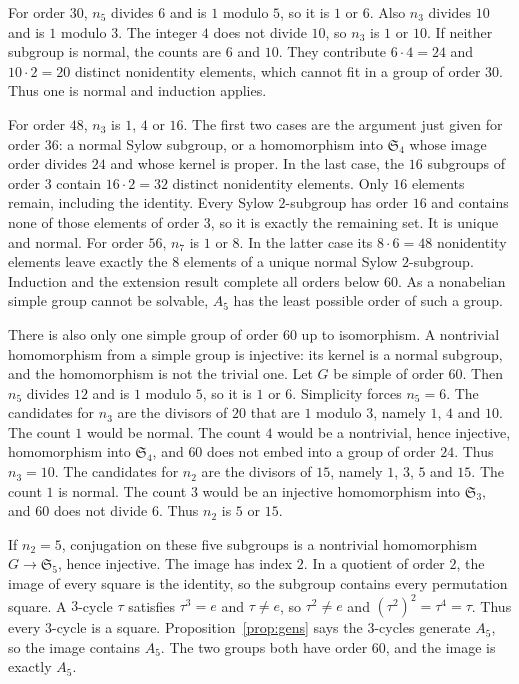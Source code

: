 For order $30$, $n_5$ divides $6$ and is $1$ modulo $5$, so it is $1$ or $6$.
Also $n_3$ divides $10$ and is $1$ modulo $3$. The integer $4$ does not divide $10$, so $n_3$ is $1$ or $10$.
If neither subgroup is normal, the counts are $6$ and $10$.
They contribute $6\cdot4=24$ and $10\cdot2=20$ distinct nonidentity elements, which cannot fit in a group of order $30$.
Thus one is normal and induction applies.

For order $48$, $n_3$ is $1$, $4$ or $16$. The first two cases are the argument just given for order $36$: a normal Sylow subgroup, or a homomorphism into $\mathfrak S_4$ whose image order divides $24$ and whose kernel is proper.
In the last case, the $16$ subgroups of order $3$ contain $16\cdot2=32$ distinct nonidentity elements.
Only $16$ elements remain, including the identity.
Every Sylow $2$-subgroup has order $16$ and contains none of those elements of order $3$, so it is exactly the remaining set. It is unique and normal.
For order $56$, $n_7$ is $1$ or $8$. In the latter case its $8\cdot6=48$ nonidentity elements leave exactly the $8$ elements of a unique normal Sylow $2$-subgroup.
Induction and the extension result complete all orders below $60$.
As a nonabelian simple group cannot be solvable, $A_5$ has the least possible order of such a group.

There is also only one simple group of order $60$ up to isomorphism.
A nontrivial homomorphism from a simple group is injective: its kernel is a normal subgroup, and the homomorphism is not the trivial one.
Let $G$ be simple of order $60$. Then $n_5$ divides $12$ and is $1$ modulo $5$, so it is $1$ or $6$. Simplicity forces $n_5=6$.
The candidates for $n_3$ are the divisors of $20$ that are $1$ modulo $3$, namely $1$, $4$ and $10$.
The count $1$ would be normal. The count $4$ would be a nontrivial, hence injective, homomorphism into $\mathfrak S_4$, and $60$ does not embed into a group of order $24$. Thus $n_3=10$.
The candidates for $n_2$ are the divisors of $15$, namely $1$, $3$, $5$ and $15$.
The count $1$ is normal. The count $3$ would be an injective homomorphism into $\mathfrak S_3$, and $60$ does not divide $6$. Thus $n_2$ is $5$ or $15$.

If $n_2=5$, conjugation on these five subgroups is a nontrivial homomorphism $G\to\mathfrak S_5$, hence injective.
The image has index $2$. In a quotient of order $2$, the image of every square is the identity, so the subgroup contains every permutation square.
A $3$-cycle $\tau$ satisfies $\tau^3=e$ and $\tau\ne e$, so $\tau^2\ne e$ and $(\tau^2)^2=\tau^4=\tau$.
Thus every $3$-cycle is a square. Proposition~\ref{prop:gens} says the $3$-cycles generate $A_5$, so the image contains $A_5$.
The two groups both have order $60$, and the image is exactly $A_5$.

